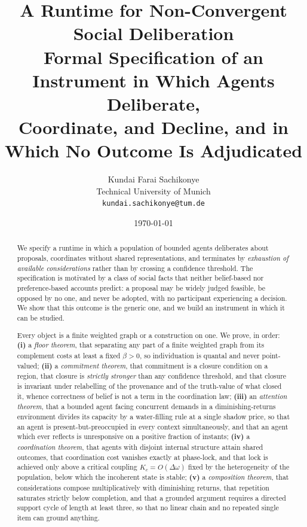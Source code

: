 \documentclass[11pt,a4paper]{article}
\title{\textbf{A Runtime for Non-Convergent Social Deliberation}\\[6pt]
\large Formal Specification of an Instrument in Which Agents Deliberate,\\
Coordinate, and Decline, and in Which No Outcome Is Adjudicated}
\author{Kundai Farai Sachikonye\\
\small Technical University of Munich\\
\small \texttt{kundai.sachikonye@tum.de}}
\date{\today}
\theoremstyle{clstyle}
\theoremstyle{definition}
\theoremstyle{remark}
\newcommand{\flo}{\beta}
\newcommand{\Kc}{K_{c}}
\begin{document}
\maketitle

\begin{abstract}
\noindent
We specify a runtime in which a population of bounded agents deliberates
about proposals, coordinates without shared representations, and terminates
by \emph{exhaustion of available considerations} rather than by crossing a
confidence threshold. The specification is motivated by a class of social
facts that neither belief-based nor preference-based accounts predict: a
proposal may be widely judged feasible, be opposed by no one, and never be
adopted, with no participant experiencing a decision. We show that this
outcome is the generic one, and we build an instrument in which it can be
studied.

Every object is a finite weighted graph or a construction on one. We prove,
in order: \textbf{(i)} a \emph{floor theorem}, that separating any part of a
finite weighted graph from its complement costs at least a fixed $\flo>0$,
so individuation is quantal and never point-valued; \textbf{(ii)} a
\emph{commitment theorem}, that commitment is a closure condition on a
region, that closure is \emph{strictly stronger} than any confidence
threshold, and that closure is invariant under relabelling of the provenance
and of the truth-value of what closed it, whence correctness of belief is
not a term in the coordination law; \textbf{(iii)} an \emph{attention
theorem}, that a bounded agent facing concurrent demands in a
diminishing-returns environment divides its capacity by a water-filling rule
at a single shadow price, so that an agent is present-but-preoccupied in
every context simultaneously, and that an agent which ever reflects is
unresponsive on a positive fraction of instants; \textbf{(iv)} a
\emph{coordination theorem}, that agents with disjoint internal structure
attain shared outcomes, that coordination cost vanishes exactly at
phase-lock, and that lock is achieved only above a critical coupling
$\Kc=O(\Delta\omega)$ fixed by the heterogeneity of the population, below
which the incoherent state is stable; \textbf{(v)} a \emph{composition
theorem}, that considerations compose multiplicatively with diminishing
returns, that repetition saturates strictly below completion, and that a
grounded argument requires a directed support cycle of length at least three,
so that no linear chain and no repeated single item can ground anything.


\end{abstract}
\end{document}
